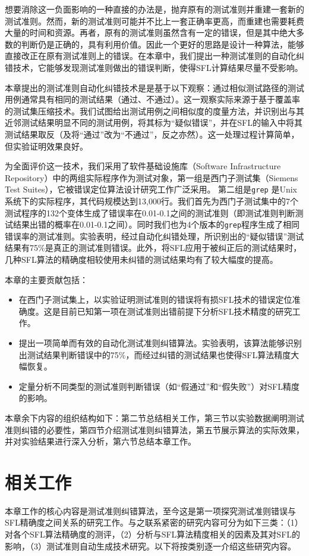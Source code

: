 想要消除这一负面影响的一种直接的办法是，抛弃原有的测试准则并重建一套新的测试准则。然而，新的测试准则可能并不比上一套正确率更高，而重建也需要耗费大量的时间和资源。再者，原有的测试准则虽然含有一定的错误，但是其中绝大多数的判断仍是正确的，具有利用价值。因此一个更好的思路是设计一种算法，能够直接改正在原有测试准则上的错误。在本章中，我们提出一种测试准则的自动化纠错技术，它能够发现测试准则做出的错误判断，使得SFL计算结果尽量不受影响。

本章提出的测试准则自动化纠错技术是是基于以下观察：通过相似测试路径的测试用例通常具有相同的测试结果（通过、不通过）。这一观察实际来源于基于覆盖率的测试集压缩技术\cite{wong1995effect}\cite{wong1999test}。我们试图给出测试用例之间相似度的度量方法，并识别出与其近邻测试结果明显不同的测试用例，将其标为“疑似错误”，并在SFL的输入中将其测试结果取反（及将“通过”改为“不通过”，反之亦然）。这一处理过程计算简单，但实验证明效果良好。

为全面评价这一技术，我们采用了软件基础设施库（Software Infrastructure Repository\cite{doESE05}）中的两组实际程序作为测试对象，第一组是西门子测试集（Siemens Test Suites），它被错误定位算法设计研究工作广泛采用。
第二组是\texttt{grep} 是Unix系统下的实际程序，其代码规模达到13,000行。我们首先为西门子测试集中的7个测试程序的132个变体生成了错误率在0.01-0.1之间的测试准则（即测试准则判断测试结果出错的概率在0.01-0.1之间）。同时我们也为4个版本的\texttt{grep}程序生成了相同错误率的测试准则。实验表明，经过自动化纠错处理，所识别出的“疑似错误”测试结果有75\%是真正的测试准则错误。此外，将SFL应用于被纠正后的测试结果时，几种SFL算法的精确度相较使用未纠错的测试结果均有了较大幅度的提高。

本章的主要贡献包括：
\begin{itemize}
	\item 在西门子测试集上，以实验证明测试准则的错误将有损SFL技术的错误定位准确度。这是目前已知第一项在测试准则出错前提下分析SFL技术精度的研究工作。
	\item 提出一项简单而有效的自动化测试准则纠错算法。实验表明，该算法能够识别出测试结果判断错误中的75\%，而经过纠错的测试结果也使得SFL算法精度大幅恢复。
	\item 定量分析不同类型的测试准则判断错误（如“假通过”和“假失败”）对SFL精度的影响。
\end{itemize}

本章余下内容的组织结构如下：第二节总结相关工作，第三节以实验数据阐明测试准则纠错的必要性，第四节介绍测试准则纠错算法，第五节展示算法的实际效果，并对实验结果进行深入分析，第六节总结本章工作。

\section{相关工作}
本章工作的核心内容是测试准则纠错算法，至今这是第一项探究测试准则错误与SFL精确度之间关系的研究工作。与之联系紧密的研究内容可分为如下三类：（1）对各个SFL算法精确度的测评，（2）分析与SFL算法精度相关的因素及其对SFL的影响，（3）测试准则自动生成技术研究。以下将按类别逐一介绍这些研究内容。

